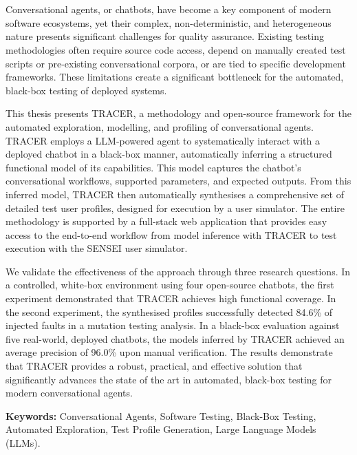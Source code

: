 \chapter{\abstractname}

Conversational agents, or chatbots,
have become a key component of modern software ecosystems,
yet their complex, non-deterministic, and heterogeneous nature
presents significant challenges for quality assurance.
Existing testing methodologies
often require source code access,
depend on manually created test scripts or pre-existing conversational corpora,
or are tied to specific development frameworks.
These limitations create a significant bottleneck
for the automated, black-box testing of deployed systems.

This thesis presents \acf{TRACER},
a methodology and open-source framework
for the automated exploration, modelling, and profiling of conversational agents.
\ac{TRACER} employs a \ac{LLM}-powered agent
to systematically interact with a deployed chatbot in a black-box manner,
automatically inferring a structured functional model of its capabilities.
This model captures the chatbot's
conversational workflows, supported parameters, and expected outputs.
From this inferred model,
\ac{TRACER} then automatically synthesises
a comprehensive set of detailed test user profiles,
designed for execution by a user simulator.
The entire methodology is supported by a full-stack web application
that provides easy access to the end-to-end workflow
from model inference with \ac{TRACER} to test execution with the SENSEI user simulator.

We validate the effectiveness of the approach through three research questions.
In a controlled, white-box environment using four open-source chatbots,
the first experiment demonstrated that \ac{TRACER} achieves high functional coverage.
In the second experiment,
the synthesised profiles successfully detected 84.6\% of injected faults in a mutation testing analysis.
In a black-box evaluation against five real-world, deployed chatbots,
the models inferred by \ac{TRACER} achieved an average precision of 96.0\% upon manual verification.
The results demonstrate that \ac{TRACER} provides a robust, practical, and effective solution
that significantly advances the state of the art in automated, black-box testing for modern conversational agents.

\vspace{2cm}

\noindent\textbf{Keywords:} Conversational Agents, Software Testing, Black-Box Testing, Automated Exploration, Test Profile Generation, Large Language Models (LLMs).
